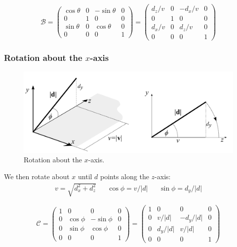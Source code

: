 \documentclass[11pt]{article}
\begin{document}
\[
  \mathcal{B} =
  \begin{pmatrix}
    \cos \theta & 0 & -\sin \theta & 0 \\
    0 & 1 & 0 & 0 \\
    \sin \theta & 0 & \cos \theta & 0 \\
    0 & 0 & 0 & 1
  \end{pmatrix}
  =
  \begin{pmatrix}
    d_z / v & 0 & -d_x / v & 0 \\
    0 & 1 & 0 & 0 \\
    d_x / v & 0 & d_z / v & 0 \\
    0 & 0 & 0 & 1
  \end{pmatrix}
\]

\subsubsection{Rotation about the $x$-axis}
\begin{figure}[htb!]
  \caption{Rotation about the $x$-axis.}
  \includegraphics[scale=0.2]{rotx}
  \centering
\end{figure}

We then rotate about $x$ until $d$ points along the $z$-axis:
\begin{align*}
  v = \sqrt{d_x^2 + d_z^2} && \cos \phi = v / \lvert d \rvert && \sin \phi = d_y / \lvert d \rvert
\end{align*}

\[
  \mathcal{C} =
  \begin{pmatrix}
    1 & 0 & 0 & 0 \\
    0 & \cos \phi & -\sin \phi & 0 \\
    0 & \sin \phi & \cos \phi & 0 \\
    0 & 0 & 0 & 1
  \end{pmatrix}
  =
  \begin{pmatrix}
    1 & 0 & 0 & 0 \\
    0 & v / \lvert d \rvert & -d_y / \lvert d \rvert & 0 \\
    0 & d_y / \lvert d \rvert & v / \lvert d \rvert & 0 \\
    0 & 0 & 0 & 1
  \end{pmatrix}
\]
\end{document}
